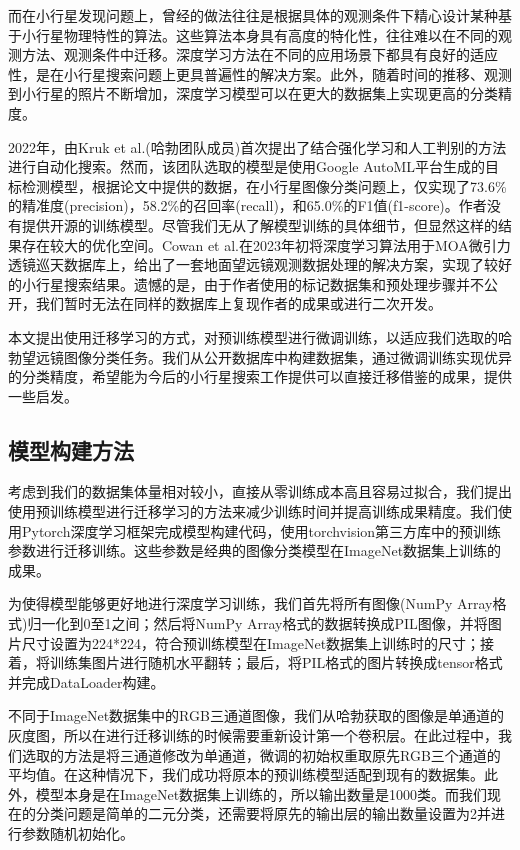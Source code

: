 \documentclass[12pt,a4paper]{article}%
\begin{document}
而在小行星发现问题上，曾经的做法往往是根据具体的观测条件下精心设计某种基于小行星物理特性的算法。这些算法本身具有高度的特化性，往往难以在不同的观测方法、观测条件中迁移。深度学习方法在不同的应用场景下都具有良好的适应性，是在小行星搜索问题上更具普遍性的解决方案。此外，随着时间的推移、观测到小行星的照片不断增加，深度学习模型可以在更大的数据集上实现更高的分类精度。

2022年，由Kruk et al.(哈勃团队成员)首次提出了结合强化学习和人工判别的方法进行自动化搜索。然而，该团队选取的模型是使用Google AutoML平台生成的目标检测模型，根据论文中提供的数据，在小行星图像分类问题上，仅实现了73.6\%的精准度(precision)，58.2\%的召回率(recall)，和65.0\%的F1值(f1-score)。作者没有提供开源的训练模型。尽管我们无从了解模型训练的具体细节，但显然这样的结果存在较大的优化空间。Cowan et al.在2023年初将深度学习算法用于MOA微引力透镜巡天数据库上，给出了一套地面望远镜观测数据处理的解决方案，实现了较好的小行星搜索结果。遗憾的是，由于作者使用的标记数据集和预处理步骤并不公开，我们暂时无法在同样的数据库上复现作者的成果或进行二次开发。

本文提出使用迁移学习的方式，对预训练模型进行微调训练，以适应我们选取的哈勃望远镜图像分类任务。我们从公开数据库中构建数据集，通过微调训练实现优异的分类精度，希望能为今后的小行星搜索工作提供可以直接迁移借鉴的成果，提供一些启发。

\subsection{模型构建方法}

考虑到我们的数据集体量相对较小，直接从零训练成本高且容易过拟合，我们提出使用预训练模型进行迁移学习的方法来减少训练时间并提高训练成果精度。我们使用Pytorch深度学习框架完成模型构建代码，使用torchvision第三方库中的预训练参数进行迁移训练。这些参数是经典的图像分类模型在ImageNet数据集上训练的成果。

为使得模型能够更好地进行深度学习训练，我们首先将所有图像(NumPy Array格式)归一化到0至1之间；然后将NumPy Array格式的数据转换成PIL图像，并将图片尺寸设置为224*224，符合预训练模型在ImageNet数据集上训练时的尺寸；接着，将训练集图片进行随机水平翻转；最后，将PIL格式的图片转换成tensor格式并完成DataLoader构建。

不同于ImageNet数据集中的RGB三通道图像，我们从哈勃获取的图像是单通道的灰度图，所以在进行迁移训练的时候需要重新设计第一个卷积层。在此过程中，我们选取的方法是将三通道修改为单通道，微调的初始权重取原先RGB三个通道的平均值。在这种情况下，我们成功将原本的预训练模型适配到现有的数据集。此外，模型本身是在ImageNet数据集上训练的，所以输出数量是1000类。而我们现在的分类问题是简单的二元分类，还需要将原先的输出层的输出数量设置为2并进行参数随机初始化。
\end{document}
